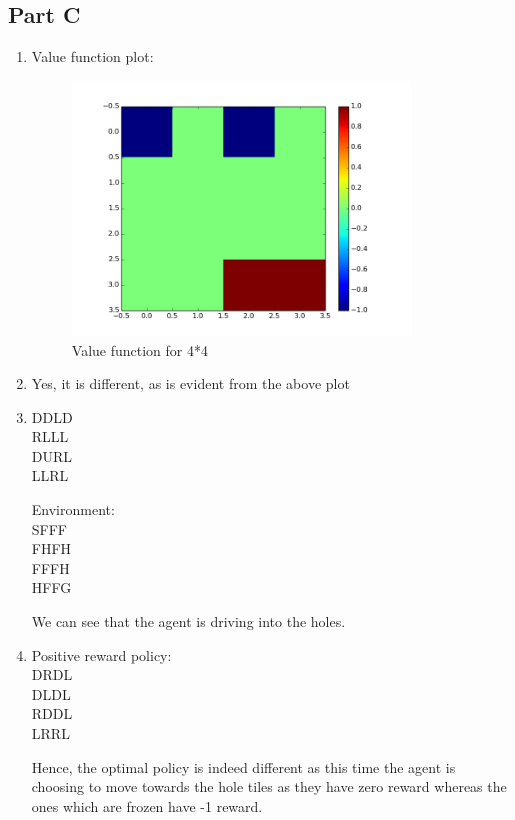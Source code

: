 \documentclass{article}
\begin{document}
\subsection{Part C}
\begin{enumerate}[label=(\alph*)]

\item Value function plot:
\begin{figure}[H]
\centering
\includegraphics[width=90mm]{4_4_neg_val_iter.png}
\caption{Value function for 4*4 \label{overflow}}
\end{figure}


\item
Yes, it is different, as is evident from the above plot

\item
DDLD\\
RLLL\\
DURL\\
LLRL

Environment:\\
SFFF\\
FHFH\\
FFFH\\
HFFG

We can see that the agent is driving into the holes. 

\item
Positive reward policy:\\
DRDL\\
DLDL\\
RDDL\\
LRRL

Hence, the optimal policy is indeed different as this time the agent is choosing to move towards the hole tiles as they have zero reward whereas the ones which are frozen have -1 reward. 

\end{enumerate}
\end{document}
